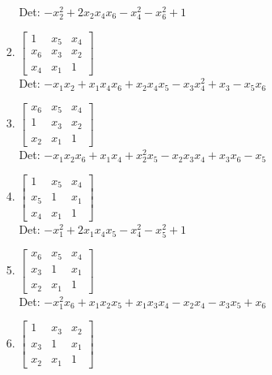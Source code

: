 \documentclass[12pt]{article}
\begin{document}
\begin{enumerate}
\begin{enumerate}
\begin{enumerate}
Det: $- x_{2}^{2} + 2 x_{2} x_{4} x_{6} - x_{4}^{2} - x_{6}^{2} + 1$\\


\item $\displaystyle \left[\begin{matrix}1 & x_{5} & x_{4}\\x_{6} & x_{3} & x_{2}\\x_{4} & x_{1} & 1\end{matrix}\right]$\\

Det: $- x_{1} x_{2} + x_{1} x_{4} x_{6} + x_{2} x_{4} x_{5} - x_{3} x_{4}^{2} + x_{3} - x_{5} x_{6}$\\


\item $\displaystyle \left[\begin{matrix}x_{6} & x_{5} & x_{4}\\1 & x_{3} & x_{2}\\x_{2} & x_{1} & 1\end{matrix}\right]$\\

Det: $- x_{1} x_{2} x_{6} + x_{1} x_{4} + x_{2}^{2} x_{5} - x_{2} x_{3} x_{4} + x_{3} x_{6} - x_{5}$\\


\item $\displaystyle \left[\begin{matrix}1 & x_{5} & x_{4}\\x_{5} & 1 & x_{1}\\x_{4} & x_{1} & 1\end{matrix}\right]$\\

Det: $- x_{1}^{2} + 2 x_{1} x_{4} x_{5} - x_{4}^{2} - x_{5}^{2} + 1$\\


\item $\displaystyle \left[\begin{matrix}x_{6} & x_{5} & x_{4}\\x_{3} & 1 & x_{1}\\x_{2} & x_{1} & 1\end{matrix}\right]$\\

Det: $- x_{1}^{2} x_{6} + x_{1} x_{2} x_{5} + x_{1} x_{3} x_{4} - x_{2} x_{4} - x_{3} x_{5} + x_{6}$\\


\item $\displaystyle \left[\begin{matrix}1 & x_{3} & x_{2}\\x_{3} & 1 & x_{1}\\x_{2} & x_{1} & 1\end{matrix}\right]$\\


\end{enumerate}
\end{enumerate}
\end{enumerate}
\end{document}
